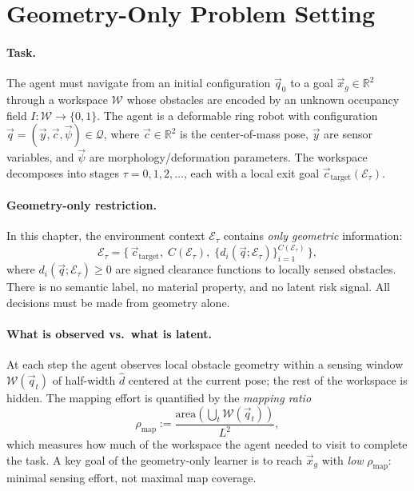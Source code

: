 \section{Geometry-Only Problem Setting}
\label{sec:ch3:setting}

\paragraph{Task.}
The agent must navigate from an initial configuration $\vec{q}_0$ to a goal
$\vec{x}_g \in \mathbb{R}^2$ through a workspace $\mathcal{W}$ whose
obstacles are encoded by an unknown occupancy field
$I : \mathcal{W} \to \{0,1\}$.
The agent is a deformable ring robot with configuration
$\vec{q} = (\vec{y}, \vec{c}, \vec{\psi}) \in \mathcal{Q}$, where
$\vec{c} \in \mathbb{R}^2$ is the center-of-mass pose,
$\vec{y}$ are sensor variables, and $\vec{\psi}$ are morphology/deformation
parameters.
The workspace decomposes into stages $\tau = 0,1,2,\ldots$, each with a
local exit goal $\vec{c}_{\mathrm{target}}(\mathcal{E}_\tau)$.

\paragraph{Geometry-only restriction.}
In this chapter, the environment context $\mathcal{E}_\tau$ contains
\emph{only geometric} information:
\begin{equation}
  \mathcal{E}_\tau
  = \bigl\{\,\vec{c}_{\mathrm{target}},\;
    C(\mathcal{E}_\tau),\;
    \{d_i(\vec{q};\mathcal{E}_\tau)\}_{i=1}^{C(\mathcal{E}_\tau)}
  \,\bigr\},
  \label{eq:ch3:context}
\end{equation}
where $d_i(\vec{q};\mathcal{E}_\tau) \geq 0$ are signed clearance functions
to locally sensed obstacles.
There is no semantic label, no material property, and no latent risk signal.
All decisions must be made from geometry alone.

\paragraph{What is observed vs.\ what is latent.}
At each step the agent observes local obstacle geometry within a sensing
window $\mathcal{W}(\vec{q}_t)$ of half-width $\hat{d}$ centered at the
current pose; the rest of the workspace is hidden.
The mapping effort is quantified by the \emph{mapping ratio}
\begin{equation}
  \rho_{\mathrm{map}}
  := \frac{\mathrm{area}\!\left(\bigcup_t \mathcal{W}(\vec{q}_t)\right)}{L^2},
  \label{eq:ch3:map_ratio}
\end{equation}
which measures how much of the workspace the agent needed to visit to
complete the task.
A key goal of the geometry-only learner is to reach $\vec{x}_g$ with
\emph{low} $\rho_{\mathrm{map}}$: minimal sensing effort, not maximal
map coverage.

